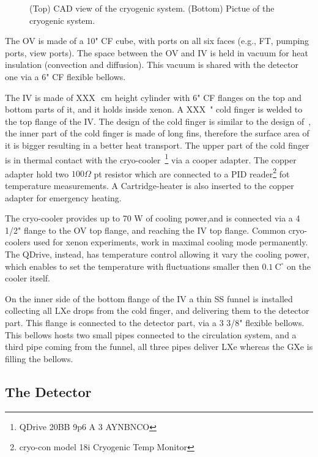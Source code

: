 \begin{figure}
\begin{subfigure}[b]{0.25\textheight}
    \end{subfigure}
        \caption{(Top) CAD view of the cryogenic system. (Bottom) Pictue of the cryogenic system. \label{fig:cryo}}
\end{figure}


The OV is made of a 10" CF cube, with ports on all six faces (e.g., FT, pumping ports, view ports). The space between the OV and IV is held in vacuum for heat insulation (convection and diffusion). This vacuum is shared with the detector one via a 6" CF flexible bellows.

The IV is made of XXX~\,cm height cylinder with 6" CF flanges on the top and bottom parts of it, and it holds inside xenon. A XXX~" cold finger is welded to the top flange of the IV. The design of the cold finger is similar to the design of~\cite{xe100_instr2012}, the inner part of the cold finger is made of long fins, therefore the surface area of it is bigger resulting in a better heat transport. The upper part of the cold finger is in thermal contact with the cryo-cooler~\footnote{QDrive 20BB 9p6 A 3 AYNBNCO} via a cooper adapter. The copper adapter hold two $100\Omega$ pt resistor which are connected to a PID reader\footnote{cryo-con model 18i Cryogenic Temp Monitor} fot temperature measurements. A Cartridge-heater is also inserted to the copper adapter for emergency heating. 

The cryo-cooler provides up to 70 W of cooling power,and is connected via a 4 1/2" flange to the OV top flange, and reaching the IV top flange. Common cryo-coolers used for xenon experiments, work in maximal cooling mode permanently. The QDrive, instead, has temperature control allowing it vary the cooling power, which enables to set the temperature with fluctuations smaller then $0.1~\mathrm{C^{\circ}}$ on the cooler itself.

On the inner side of the bottom flange of the IV a thin SS funnel is installed collecting all LXe drops from the cold finger, and delivering them to the  detector part. This flange is connected to the detector part, via a 3 3/8" flexible bellows. This bellows hosts two small pipes connected to the circulation system, and a third pipe coming from the funnel, all three pipes deliver LXe whereas the GXe is filling the bellows.

\subsection{The Detector}
\label{subsec:det}

